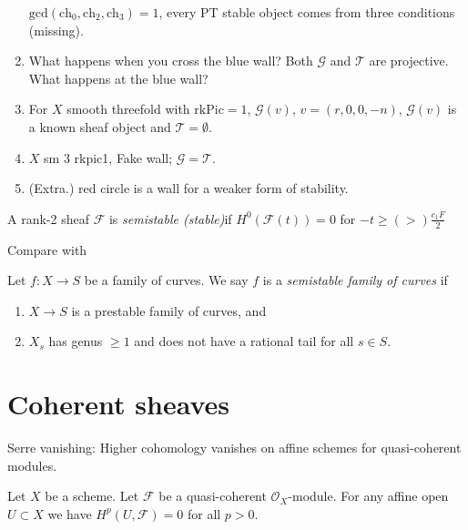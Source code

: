 \begin{enumerate}
$\text{gcd}(\text{ch}_0,\text{ch}_2,\text{ch}_3)=1$, every PT stable object
comes from three conditions (missing).
\item What happens when you cross the blue wall? 
Both $\mathcal{G}$ and $\mathcal{T}$ are projective. What happens at the blue
wall?
\medskip
\item For $X$ smooth threefold with $\text{rk}\text{Pic}=1$, $\mathcal{G}(v)$,
$v=(r,0,0,-n)$, $\mathcal{G}(v)$ is a known sheaf object and
$\mathcal{T}=\emptyset$.
\item $X$ sm 3 rkpic1, Fake wall; $\mathcal{G}=\mathcal{T}$.
\item (Extra.) red circle is a wall for a weaker form of stability.
\end{enumerate}
\begin{definition}
\label{definition-slope-stability}
A rank-2 sheaf $\mathcal{F}$ is {\it semistable (stable)}if
$H^{0}(\mathcal{F}(t))=0$ for $-t \geq(>) \frac{c_1F}{2}$
\end{definition}

Compare with

\begin{definition}
\label{definition-semistable}
Let $f : X \to S$ be a family of curves.
We say $f$ is a {\it semistable family of curves} if
\begin{enumerate}
\item $X \to S$ is a prestable family of curves, and
\item $X_s$ has genus $\geq 1$ and
does not have a rational tail for all $s \in S$.
\end{enumerate}
\end{definition}

\section{Coherent sheaves}
\label{section-coherent-sheaves}

\begin{lemma}
\label{lemma-quasi-coherent-affine-cohomology-zero}
\begin{slogan}
Serre vanishing: Higher cohomology vanishes on affine schemes
for quasi-coherent modules.
\end{slogan}
Let $X$ be a scheme.
Let $\mathcal{F}$ be a quasi-coherent $\mathcal{O}_X$-module.
For any affine open $U \subset X$ we have
$H^p(U, \mathcal{F}) = 0$ for all $p > 0$.
\end{lemma}


